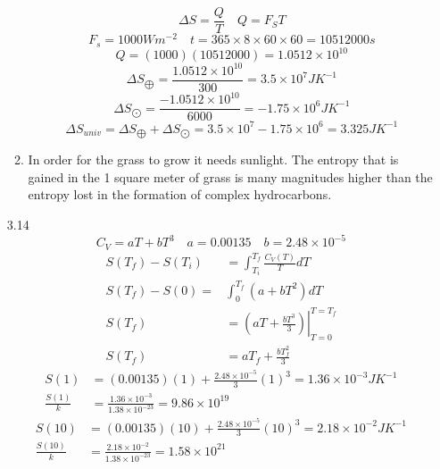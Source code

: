 \documentclass{article}
\begin{document}
\begin{enumerate}
\begin{enumerate}
                \[\Delta S = \frac{Q}{T} \quad Q = F_S T\]
                \[F_s = 1000 Wm^{-2} \quad t = 365 \times 8 \times 60 \times 60 = 10512000 s\]
                \[Q = (1000)(10512000) = 1.0512 \times 10^{10}\]
                \[\Delta S_{\bigoplus} = \frac{1.0512 \times 10^{10}}{300} = 3.5 \times 10^7 JK^{-1}\]
                \[\Delta S_{\bigodot} = \frac{-1.0512 \times 10^{10}}{6000} = -1.75 \times 10^6 JK^{-1}\]
                \[\Delta S_{univ} = \Delta S_{\bigoplus} + \Delta S_{\bigodot} = 3.5 \times 10^7 - 1.75 \times 10^6 = 3.325 JK^{-1}\]
            \item
                In order for the grass to grow it needs sunlight. The entropy that is gained in the 1 square meter of grass is many magnitudes higher than the entropy lost in the formation of complex hydrocarbons.
        \end{enumerate}
    \vspace{0.1in}
    \item [3.14]
        \[C_V = aT + bT^3 \quad a= 0.00135 \quad b = 2.48 \times 10^{-5}\]
        \begin{align*}
            S(T_f) - S(T_i) &= \int_{T_i}^{T_f} \frac{C_V(T)}{T} dT \\
            S(T_f) - S(0) =& \int_{0}^{T_f} (a + bT^2) dT \\
            S(T_f) &= \left. \left( aT + \frac{bT^3}{3} \right) \right|_{T = 0}^{T = T_f} \\
            S(T_f) &= aT_f + \frac{bT_f^2}{3}
        \end{align*}
        \begin{align*}
            S(1) &= (0.00135)(1) + \frac{2.48 \times 10^{-5}}{3} (1)^3 = 1.36 \times 10^{-3} JK^{-1} \\
            \frac{S(1)}{k} &= \frac{1.36 \times 10^{-3}}{1.38 \times 10^{-23}} = 9.86 \times 10^{19}
        \end{align*}
        \begin{align*}
            S(10) &= (0.00135)(10) + \frac{2.48 \times 10^{-5}}{3} (10)^3 = 2.18 \times 10^{-2} JK^{-1} \\
            \frac{S(10)}{k} &= \frac{2.18 \times 10^{-2}}{1.38 \times 10^{-23}} = 1.58 \times 10^{21}
        \end{align*}
\end{enumerate}
\end{document}
